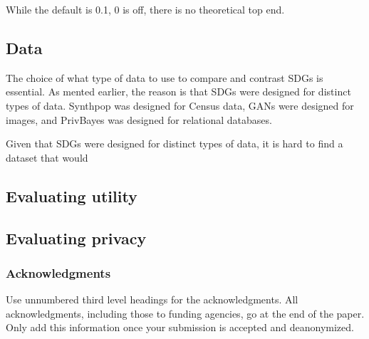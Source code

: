 \documentclass[runningheads]{llncs}
\begin{document}
While the default is 0.1, 0 is off, there is no theoretical top end.

\subsection{Data}

The choice of what type of data to use to compare and contrast SDGs is essential.  As mented earlier, the reason is that SDGs were designed for distinct types of data.  Synthpop was designed for Census data, GANs were designed for images, and PrivBayes was designed for relational databases.

Given that SDGs were designed for distinct types of data, it is hard to find a dataset that would 

\subsection{Evaluating utility}

\subsection{Evaluating privacy}

\subsubsection*{Acknowledgments}
Use unnumbered third level headings for the acknowledgments. All acknowledgments, including those to funding agencies, go at the end of the paper. Only add this information once your submission is accepted and deanonymized. 

\clearpage




\clearpage



\clearpage


\clearpage
\appendix

\end{document}
